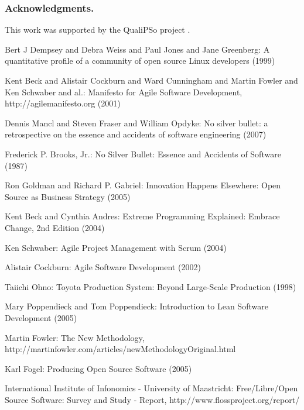 \documentclass[lnbip]{svmultln}
\begin{document}
\subsubsection*{Acknowledgments.}

This work was supported by the QualiPSo project \cite{url:qualipso}.

\begin{thebibliography}{5}

 Bert J Dempsey and Debra Weiss and Paul
  Jones and Jane Greenberg: A quantitative profile of a community of
  open source Linux developers (1999)

 Kent Beck and Alistair Cockburn and Ward
  Cunningham and Martin Fowler and Ken Schwaber and al.: Manifesto for
  Agile Software Development, http://agilemanifesto.org (2001)

 Dennis Mancl and Steven Fraser and
  William Opdyke: No silver bullet: a retrospective on the essence and
  accidents of software engineering (2007)

 Frederick P. Brooks, Jr.: No Silver Bullet:
  Essence and Accidents of Software (1987)

 Ron Goldman and Richard P. Gabriel: Innovation
  Happens Elsewhere: Open Source as Business Strategy (2005)

 Kent Beck and Cynthia Andres: Extreme Programming
  Explained: Embrace Change, 2nd Edition (2004)

 Ken Schwaber: Agile Project Management with
  Scrum (2004)

 Alistair Cockburn: Agile Software Development
  (2002)

 Taiichi Ohno: Toyota Production System: Beyond
  Large-Scale Production (1998)

 Mary Poppendieck and Tom Poppendieck:
  Introduction to Lean Software Development (2005)

 Martin Fowler: The New Methodology,
  http://martinfowler.com/articles/newMethodologyOriginal.html

 Karl Fogel: Producing Open Source Software (2005)

 International Institute of Infonomics -
  University of Maastricht: Free/Libre/Open Source Software: Survey
  and Study - Report, http://www.flossproject.org/report/


\end{thebibliography}
\end{document}
